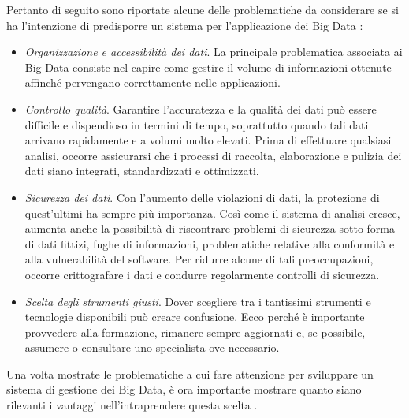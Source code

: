 Pertanto di seguito sono riportate alcune delle problematiche da considerare se si ha l'intenzione di predisporre un sistema per l'applicazione dei Big Data \cite{microsoft_big_data}:

\begin{itemize}
    \item \textit{Organizzazione e accessibilità dei dati}. La principale problematica associata ai Big Data consiste nel capire come gestire il volume di informazioni ottenute affinché pervengano correttamente nelle applicazioni.
    \item \textit{Controllo qualità}. Garantire l'accuratezza e la qualità dei dati può essere difficile e dispendioso in termini di tempo, soprattutto quando tali dati arrivano rapidamente e a volumi molto elevati. Prima di effettuare qualsiasi analisi, occorre assicurarsi che i processi di raccolta, elaborazione e pulizia dei dati siano integrati, standardizzati e ottimizzati.
    \item \textit{Sicurezza dei dati}. Con l'aumento delle violazioni di dati, la protezione di quest'ultimi ha sempre più importanza. Così come il sistema di analisi cresce, aumenta anche la possibilità di riscontrare problemi di sicurezza sotto forma di dati fittizi, fughe di informazioni, problematiche relative alla conformità e alla vulnerabilità del software. Per ridurre alcune di tali preoccupazioni, occorre crittografare i dati e condurre regolarmente controlli di sicurezza.
    \item \textit{Scelta degli strumenti giusti}. Dover scegliere tra i tantissimi strumenti e tecnologie disponibili può creare confusione. Ecco perché è importante provvedere alla formazione, rimanere sempre aggiornati e, se possibile, assumere o consultare uno specialista ove necessario.
\end{itemize}

Una volta mostrate le problematiche a cui fare attenzione per sviluppare un sistema di gestione dei Big Data, è ora importante mostrare quanto siano rilevanti i vantaggi nell'intraprendere questa scelta \cite{oracle_big_data}.

